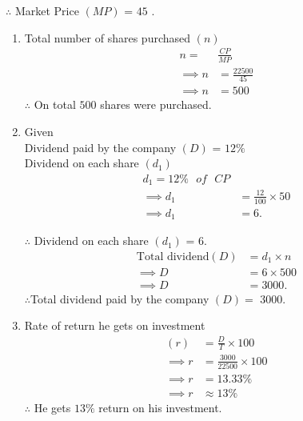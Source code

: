 \documentclass[journal,12pt,twocolumn]{IEEEtran}
\begin{document}
$\therefore$ Market Price \((MP)\) = \rupee $45$ . 
\begin{enumerate}
    \item 
    Total number of shares purchased $(n)$ 
    \begin{align*}
       n =&\frac{CP}{MP} \\
       \implies n &= \frac{22500}{45}\\
       \implies n &= 500
    \end{align*}
    $\therefore$ On total $500$ shares were purchased.
    \item
    Given\\
    Dividend paid by the company $(D)$ = $12\%$\\
    Dividend on each share $(d_1)$  
    \begin{align*}
       d_1 = 12\% \text{ $of$ }CP\\
      \implies d_1 &= \frac{12}{100}\times 50\\  \implies d_1 &= 6 .
    \end{align*}
    
    $\therefore$ Dividend on each share $(d_1)$ = \rupee$ 6$.
    \begin{align*}
       \text{Total dividend$(D)$} &= d_1 \times n \\
       \implies D &= 6 \times 500 \\
       \implies D &= 3000 .
    \end{align*}
    $\therefore$Total dividend paid by the company $(D) =$ \rupee $3000$.
    \item
    Rate of return he gets on investment
    \begin{align*}
        (r) &= \frac{D}{T} \times 100\\
        \implies r &= \frac{3000}{22500}\times 100\\
        \implies r &= 13.33\%\\
        \implies r &\approx 13\%
    \end{align*}
    $\therefore$ He gets $13\%$ return on his investment.
\end{enumerate}
\end{document}
